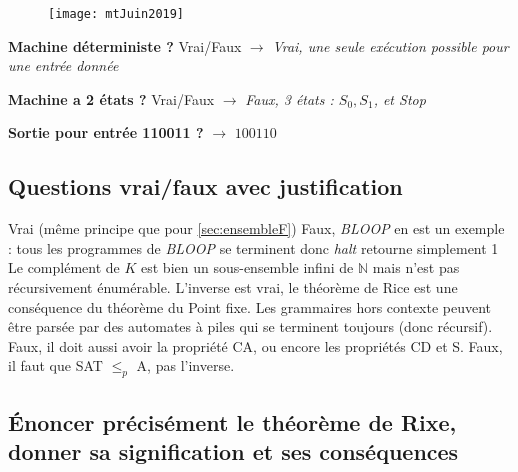 \begin{figure}[H]
    \centering
    \texttt{[image: mtJuin2019]}
\end{figure}

\textbf{Machine déterministe ?} Vrai/Faux $\rightarrow$ \textit{Vrai, une seule exécution possible pour une entrée donnée}

\textbf{Machine a 2 états ?} Vrai/Faux $\rightarrow$ \textit{Faux, 3 états : $S_0, S_1$, et Stop}

\textbf{Sortie pour entrée 110011 ?} $\rightarrow$ \textit{$100110$}

\subsection*{Questions vrai/faux avec justification}

\begin{mcqs}
  {Vrai (même principe que pour \ref{sec:ensembleF})}
  {Faux, \emph{BLOOP} en est un exemple : tous les programmes de \emph{BLOOP} se terminent donc \emph{halt} retourne simplement 1}
  {Le complément de $K$ est bien un sous-ensemble infini de $\mathbb{N}$ mais n'est pas récursivement énumérable.}
  {L'inverse est vrai, le théorème de Rice est une conséquence du théorème du Point fixe.}
  {Les grammaires hors contexte peuvent être parsée par des automates à piles qui se terminent toujours (donc récursif).}
  {Faux, il doit aussi avoir la propriété CA, ou encore les propriétés CD et S.}
  {Faux, il faut que SAT $\leq_p$ A, pas l'inverse.}
\end{mcqs}

\subsection*{Énoncer précisément le théorème de Rixe, donner sa signification et ses conséquences}

